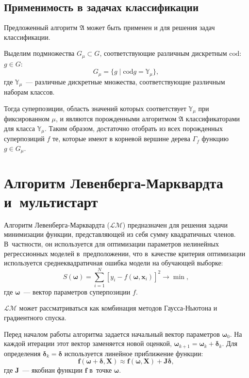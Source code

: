 \documentclass[12pt,a4paper]{article}
\begin{document}
\subsection{Применимость в задачах классификации}

Предложенный алгоритм $\mathfrak{A}$ может быть применен и для решения
задач классификации.

Выделим подмножества $G_\mu \subset G$, соответствующие различным дискретным
$\text{cod}$:
$g \in G$:
\[
  G_\mu = \{ g \mid \text{cod} g = \mathbb{Y}_\mu \},
\]
где $\mathbb{Y}_\mu$~--- различные дискретные множества, соответствующие
различным наборам классов.

Тогда суперпозиции, область значений которых соответствует $\mathbb{Y}_\mu$
при фиксированном $\mu$, и являются порожденными алгоритмом $\mathfrak{A}$
классификаторами для класса $\mathbb{Y}_\mu$. Таким образом, достаточно отобрать
из всех порожденных суперпозиций $f$ те, которые имеют в корневой вершине
дерева $\Gamma_f$ функцию $g \in G_\mu$.

\section{Алгоритм Левенберга-Марквардта и~мультистарт}

Алгоритм Левенберга-Марквардта ($\mathcal{LM}$) \cite{Marquardt1963Algorithm, more:78}
предназначен для решения задачи минимизации функции, представляющей из себя
сумму квадратичных членов. В~частности, он используется для оптимизации
параметров нелинейных регрессионных моделей в~предположении, что в~качестве
критерия оптимизации используется среднеквадратичная ошибка модели на
обучающей выборке:
\[
S(\boldsymbol{\omega}) = \sum_{i=1}^{N} [y_i - f(\boldsymbol{\omega}, \mathbf{x}_i)]^2 \to \min,
\]
где $\boldsymbol{\omega}$~--- вектор параметров суперпозиции $f$.

$\mathcal{LM}$ может рассматриваться как комбинация методов Гаусса-Ньютона и
градиентного спуска.

Перед началом работы алгоритма задается начальный вектор параметров $\boldsymbol{\omega}_0$.
На каждой итерации этот вектор заменяется новой оценкой,
$\boldsymbol{\omega}_{k+1} = \boldsymbol{\omega}_k + \boldsymbol{\delta}_k$.
Для определения $\boldsymbol{\delta}_k = \boldsymbol{\delta}$ используется линейное приближение функции:
\[
\mathbf{f(\boldsymbol{\omega} + \boldsymbol{\delta}, X)} \approx
	\mathbf{f(\boldsymbol{\omega}, X)} + \mathbf{J} \boldsymbol{\delta},
\]
где $\mathbf{J}$~--- якобиан функции $\mathbf{f}$ в~точке $\boldsymbol{\omega}$.
\end{document}
